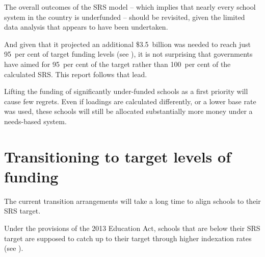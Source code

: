 \documentclass{grattan}
\begin{document}
The overall outcomes of the SRS model -- which implies that nearly every school system in the country is underfunded -- should be revisited, given the limited data analysis that appears to have been undertaken.

And given that it projected an additional \$3.5~billion was needed to reach just 95~per cent of target funding levels (see ), it is not surprising that governments have aimed for 95~per cent of the target rather than 100~per cent of the calculated SRS\@. This report follows that lead.

Lifting the funding of significantly under-funded schools as a first priority will cause few regrets.
Even if loadings are calculated differently, or a lower base rate was used, these schools will still be allocated substantially more money under a needs-based system.

\section{Transitioning to target levels of funding}\label{sec:The-current-transition-arrangements-will-take-a-long-time}

The current transition arrangements will take a long time to align schools to their SRS target.

Under the provisions of the 2013 Education Act, schools that are below their SRS target are supposed to catch up to their target through higher indexation rates (see ).
\end{document}
